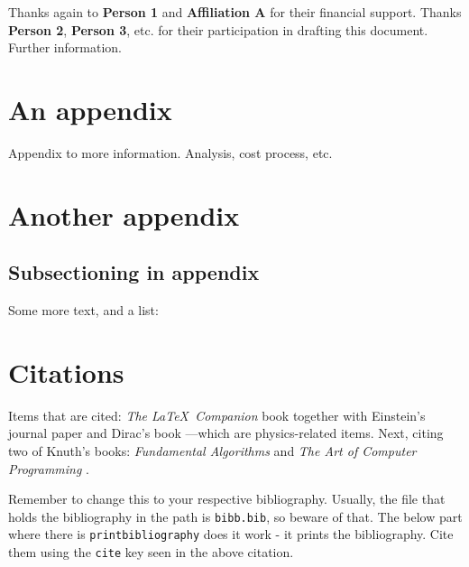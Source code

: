 \documentclass[10pt,a4paper]{article}
\begin{document}
Thanks again to \textbf{Person 1} and \textbf{Affiliation A} for their financial support. Thanks \textbf{Person 2}, \textbf{Person 3}, etc. for their participation in drafting this document. Further information. 


% 
% 

\appendix

\section{An appendix}

Appendix to more information. Analysis, cost process, etc. 

\section{Another appendix}

\subsection*{Subsectioning in appendix}

Some more text, and a list:

\blindenumerate



\section{Citations}
Items that are cited: \textit{The \LaTeX\ Companion} book \cite{latexcompanion} together with Einstein's journal paper \cite{einstein} and Dirac's book \cite{dirac}---which are physics-related items. Next, citing two of Knuth's books: \textit{Fundamental Algorithms} \cite{knuth-fa} and \textit{The Art of Computer Programming} \cite{knuthwebsite}.


Remember to change this to your respective bibliography. Usually, the file that holds the bibliography in the path is \texttt{bibb.bib}, so beware of that. The below part where there is \texttt{printbibliography} does it work - it prints the bibliography. Cite them using the \texttt{cite} key seen in the above citation. 

\medskip

\printbibliography %
\end{document}
